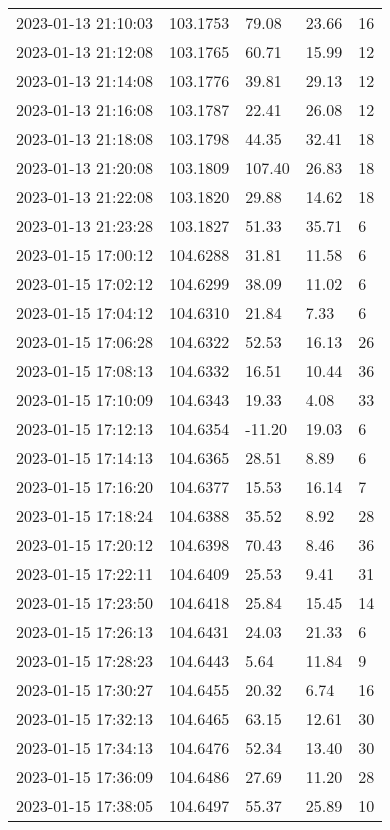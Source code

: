 \documentclass{nature_plusfigure}
\begin{document}
\begin{supplement}
\begin{center}
\begin{longtable}{lllll}
2023-01-13 21:10:03 & 103.1753 & 79.08 & 23.66 & 16 \\ 
2023-01-13 21:12:08 & 103.1765 & 60.71 & 15.99 & 12 \\ 
2023-01-13 21:14:08 & 103.1776 & 39.81 & 29.13 & 12 \\ 
2023-01-13 21:16:08 & 103.1787 & 22.41 & 26.08 & 12 \\ 
2023-01-13 21:18:08 & 103.1798 & 44.35 & 32.41 & 18 \\ 
2023-01-13 21:20:08 & 103.1809 & 107.40 & 26.83 & 18 \\ 
2023-01-13 21:22:08 & 103.1820 & 29.88 & 14.62 & 18 \\ 
2023-01-13 21:23:28 & 103.1827 & 51.33 & 35.71 & 6 \\ 
2023-01-15 17:00:12 & 104.6288 & 31.81 & 11.58 & 6 \\ 
2023-01-15 17:02:12 & 104.6299 & 38.09 & 11.02 & 6 \\ 
2023-01-15 17:04:12 & 104.6310 & 21.84 & 7.33 & 6 \\ 
2023-01-15 17:06:28 & 104.6322 & 52.53 & 16.13 & 26 \\ 
2023-01-15 17:08:13 & 104.6332 & 16.51 & 10.44 & 36 \\ 
2023-01-15 17:10:09 & 104.6343 & 19.33 & 4.08 & 33 \\ 
2023-01-15 17:12:13 & 104.6354 & -11.20 & 19.03 & 6 \\ 
2023-01-15 17:14:13 & 104.6365 & 28.51 & 8.89 & 6 \\ 
2023-01-15 17:16:20 & 104.6377 & 15.53 & 16.14 & 7 \\ 
2023-01-15 17:18:24 & 104.6388 & 35.52 & 8.92 & 28 \\ 
2023-01-15 17:20:12 & 104.6398 & 70.43 & 8.46 & 36 \\ 
2023-01-15 17:22:11 & 104.6409 & 25.53 & 9.41 & 31 \\ 
2023-01-15 17:23:50 & 104.6418 & 25.84 & 15.45 & 14 \\ 
2023-01-15 17:26:13 & 104.6431 & 24.03 & 21.33 & 6 \\ 
2023-01-15 17:28:23 & 104.6443 & 5.64 & 11.84 & 9 \\ 
2023-01-15 17:30:27 & 104.6455 & 20.32 & 6.74 & 16 \\ 
2023-01-15 17:32:13 & 104.6465 & 63.15 & 12.61 & 30 \\ 
2023-01-15 17:34:13 & 104.6476 & 52.34 & 13.40 & 30 \\ 
2023-01-15 17:36:09 & 104.6486 & 27.69 & 11.20 & 28 \\ 
2023-01-15 17:38:05 & 104.6497 & 55.37 & 25.89 & 10 \\ 

\end{longtable}
\end{center}
\end{supplement}
\end{document}
